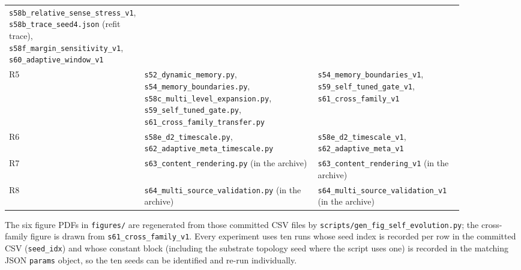 \documentclass[preprint,12pt]{elsarticle}
\begin{document}
\begin{longtable}{@{}>{\footnotesize}p{0.07\linewidth}>{\footnotesize}p{0.47\linewidth}>{\footnotesize}p{0.34\linewidth}@{}}
\texttt{s58b\_relative\_sense\_stress\_v1},
\texttt{s58b\_trace\_seed4.json} (refit trace),
\texttt{s58f\_margin\_sensitivity\_v1}, \texttt{s60\_adaptive\_window\_v1} \\
R5 & \texttt{s52\_dynamic\_memory.py}, \texttt{s54\_memory\_boundaries.py},
\texttt{s58c\_multi\_level\_expansion.py}, \texttt{s59\_self\_tuned\_gate.py},
\texttt{s61\_cross\_family\_transfer.py} &
\texttt{s54\_memory\_boundaries\_v1}, \texttt{s59\_self\_tuned\_gate\_v1},
\texttt{s61\_cross\_family\_v1} \\
R6 & \texttt{s58e\_d2\_timescale.py},
\texttt{s62\_adaptive\_meta\_timescale.py} &
\texttt{s58e\_d2\_timescale\_v1}, \texttt{s62\_adaptive\_meta\_v1} \\
R7 & \texttt{s63\_content\_rendering.py} (in the archive) &
\texttt{s63\_content\_rendering\_v1} (in the archive) \\
R8 & \texttt{s64\_multi\_source\_validation.py} (in the archive) &
\texttt{s64\_multi\_source\_validation\_v1} (in the archive) \\
\end{longtable}

The six figure PDFs in \texttt{figures/} are regenerated from those committed
CSV files by \texttt{scripts/gen\_fig\_self\_evolution.py}; the cross-family
figure is drawn from \texttt{s61\_cross\_family\_v1}. Every experiment uses ten
runs whose seed index is recorded per row in the committed CSV
(\texttt{seed\_idx}) and whose constant block (including the substrate
topology seed where the script uses one) is recorded in the matching JSON
\texttt{params} object, so the ten seeds can be identified and re-run
individually.
\end{document}
